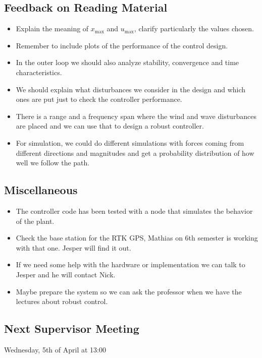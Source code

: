 \subsection{Feedback on Reading Material}
\begin{itemize}
    \item Explain the meaning of $x_\mathrm{max}$ and $u_\mathrm{max}$, clarify particularly the values chosen.
    \item Remember to include plots of the performance of the control design.    
    \item In the outer loop we should also analyze stability, convergence and time characteristics.
    \item We should explain what disturbances we consider in the design and which ones are put just to check the controller performance.
    \item There is a range and a frequency span where the wind and wave disturbances are placed and we can use that to design a robust controller.
    \item For simulation, we could do different simulations with forces coming from different directions and magnitudes and get a probability distribution of how well we follow the path.  
\end{itemize}

\subsection{Miscellaneous}
\begin{itemize}
    \item The controller code has been tested with a  node that simulates the behavior of the plant.
    \item Check the base station for the RTK GPS, Mathias on 6th semester is working with that one. Jesper will find it out.
    \item If we need some help with the hardware or implementation we can talk to Jesper and he will contact Nick.
    \item Maybe prepare the system so we can ask the professor when we have the lectures about robust control.
\end{itemize}

\subsection{Next Supervisor Meeting}
Wednesday, 5th of April at 13:00

